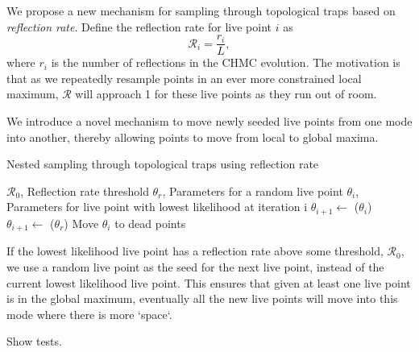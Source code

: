 \documentclass[11pt]{article}
\begin{document}
    We propose a new mechanism for sampling through topological traps based on \emph{reflection rate}.
    Define the reflection rate for live point $i$ as
    \begin{equation}\label{eq:reflect_rate}
        \mathcal{R}_i = \frac{r_i}{L},
    \end{equation}
    where $r_i$ is the number of reflections in the CHMC evolution.
    The motivation is that as we repeatedly resample points in an ever more constrained local maximum,
    $\mathcal{R}$ will approach 1 for these live points as they run out of room.

    We introduce a novel mechanism to move newly seeded live points from one mode into
    another, thereby allowing points to move from local to global maxima.

    \begin{algorithm}
        \caption{Nested sampling through topological traps using reflection rate}
        \label{alg:reflection_rate}
        \begin{algorithmic}
            \VARIABLES
            \STATE $\mathcal{R}_0$, Reflection rate threshold
            \STATE $\theta_r$, Parameters for a random live point
            \ENDVARIABLES
            \STATE
            \STATE $\theta_i$, Parameters for live point with lowest likelihood at iteration i
            \STATE $\theta_{i+1} \gets$ ($\theta_i$)
            \ELSE
            \STATE $\theta_{i+1} \gets$ ($\theta_r$)
            \ENDIF
            \STATE Move $\theta_i$ to dead points
        \end{algorithmic}
    \end{algorithm}

    If the lowest likelihood live point has a reflection rate above some threshold, $\mathcal{R}_0$, we use a
    random live point as the seed for the next live point, instead of the current lowest likelihood live point.
    This ensures that given at least one live point is in the global maximum, eventually all the new live points will move
    into this mode where there is more `space`.

    Show tests.
\end{document}
